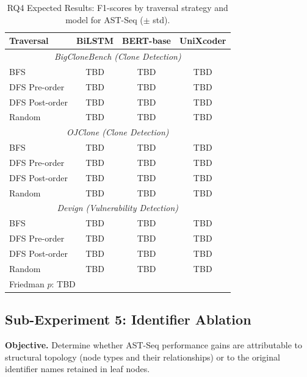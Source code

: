 \documentclass[pdflatex,sn-mathphys,Numbered]{sn-jnl}
\newcommand{\RQFourBFS}{TBD}        %
\newcommand{\RQFourDFS}{TBD}        %
\newcommand{\RQFourPost}{TBD}       %
\newcommand{\RQFourRand}{TBD}       %
\newcommand{\RQFourPval}{TBD}       %
\begin{document}
\begin{table}[tb]
\centering
\caption{RQ4 Expected Results: F1-scores by traversal strategy and model for AST-Seq ($\pm$ std).}\label{tab:rq4}
\begin{tabular}{lccc}
\toprule
Traversal & BiLSTM & BERT-base & UniXcoder \\
\midrule
\multicolumn{4}{c}{\textit{BigCloneBench (Clone Detection)}} \\
BFS            & \RQFourBFS{}  & \RQFourBFS{}  & \RQFourBFS{} \\
DFS Pre-order  & \RQFourDFS{}  & \RQFourDFS{}  & \RQFourDFS{} \\
DFS Post-order & \RQFourPost{} & \RQFourPost{} & \RQFourPost{} \\
Random         & \RQFourRand{} & \RQFourRand{} & \RQFourRand{} \\
\midrule
\multicolumn{4}{c}{\textit{OJClone (Clone Detection)}} \\
BFS            & \RQFourBFS{}  & \RQFourBFS{}  & \RQFourBFS{} \\
DFS Pre-order  & \RQFourDFS{}  & \RQFourDFS{}  & \RQFourDFS{} \\
DFS Post-order & \RQFourPost{} & \RQFourPost{} & \RQFourPost{} \\
Random         & \RQFourRand{} & \RQFourRand{} & \RQFourRand{} \\
\midrule
\multicolumn{4}{c}{\textit{Devign (Vulnerability Detection)}} \\
BFS            & \RQFourBFS{}  & \RQFourBFS{}  & \RQFourBFS{} \\
DFS Pre-order  & \RQFourDFS{}  & \RQFourDFS{}  & \RQFourDFS{} \\
DFS Post-order & \RQFourPost{} & \RQFourPost{} & \RQFourPost{} \\
Random         & \RQFourRand{} & \RQFourRand{} & \RQFourRand{} \\
\midrule
\multicolumn{4}{l}{Friedman $p$: \RQFourPval{}} \\
\bottomrule
\end{tabular}
\end{table}

\subsection{Sub-Experiment 5: Identifier Ablation}

\textbf{Objective.} Determine whether AST-Seq performance gains are attributable to structural topology (node types and their relationships) or to the original identifier names retained in leaf nodes.
\end{document}
